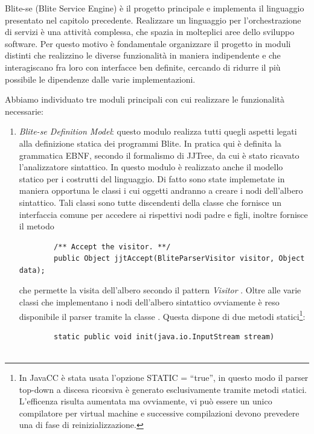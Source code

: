 Blite-se (Blite Service Engine) è il progetto principale e implementa il
linguaggio presentato nel capitolo precedente. Realizzare un linguaggio per
l'orchestrazione di servizi è una attività complessa, che spazia in molteplici
aree dello sviluppo software. Per questo motivo è fondamentale organizzare il
progetto in moduli distinti che realizzino le diverse funzionalità in maniera
indipendente e che interagiscano fra loro con interfacce ben definite,
cercando di ridurre il più possibile le dipendenze dalle varie implementazioni.

Abbiamo individuato tre moduli principali con cui realizzare le funzionalità
necessarie:

\begin{enumerate}
  \item \emph{Blite-se Definition Model}: questo modulo realizza tutti quegli
  aspetti legati alla definizione statica dei programmi Blite. In pratica
  qui è definita la grammatica EBNF, secondo il formalismo di JJTree, da cui è 
  stato ricavato l'analizzatore sintattico. In questo modulo è realizzato anche
  il modello statico per i costrutti del linguaggio. Di fatto sono state
  implemetate in maniera opportuna le classi i cui oggetti andranno a creare i
  nodi dell'albero sintattico. Tali classi sono tutte discendenti della classe
   che fornisce un interfaccia comune per accedere ai
  rispettivi nodi padre e figli, inoltre fornisce il metodo
	\begin{lstlisting}
		/** Accept the visitor. **/
		public Object jjtAccept(BliteParserVisitor visitor, Object data);
  	\end{lstlisting}  
  che permette la visita dell'albero secondo il pattern \emph{Visitor}
  \cite{GANGo4}. Oltre alle varie classi che implementano i nodi dell'albero sintattico  
  ovviamente è reso disponibile il parser tramite la classe .
  Questa dispone di due metodi statici\footnote{In JavaCC è stata usata
  l'opzione \textrm{STATIC = ``true''}, in questo modo il parser top-down a
  discesa ricorsiva è generato esclusivamente tramite metodi statici.
  L'efficenza risulta aumentata ma ovviamente, vi può essere un
  unico compilatore per virtual machine e successive compilazioni devono
  prevedere una di fase di reinizializzazione.}:
	\begin{lstlisting}	
		static public void init(java.io.InputStream stream)


\end{lstlisting}
\end{enumerate}
